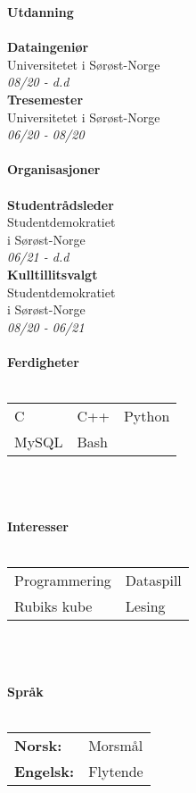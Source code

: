 \documentclass[a4paper, 12pt]{article}
\begin{document}
    \begin{minipage}[t]{0.3\textwidth}
        \Large\textbf{Utdanning}\\\\
        \normalsize\textbf{Dataingeniør}\\
        \small{Universitetet i Sørøst-Norge}\\
        \small \textit{08/20 - d.d} \\

        \normalsize\textbf{Tresemester}\\
        \small{Universitetet i Sørøst-Norge}\\
        \small \textit{06/20 - 08/20}\\\\
        \horizontalline{2.5cm}{0.4cm}
        \Large\textbf{Organisasjoner}\\\\
        \normalsize\textbf{Studentrådsleder}\\
        \small{Studentdemokratiet \\i Sørøst-Norge}\\
        \small{\textit{06/21 - d.d}}\\

        \normalsize\textbf{Kulltillitsvalgt}\\
        \small{Studentdemokratiet \\i Sørøst-Norge}\\
        \small{\textit{08/20 - 06/21}}\\\\
        \horizontalline{2.5cm}{0.4cm}
        \Large\textbf{Ferdigheter}\\\\
        \normalsize{
        \begin{tabular}{@{}l l l}
            C & C++ & Python \\
            MySQL & Bash & \\
        \end{tabular}\\\\
    }
        \horizontalline{2.5cm}{0.4cm}
        \Large\textbf{Interesser}\\\\
        \normalsize{
        \begin{tabular}{@{}l l}
            Programmering & Dataspill \\
            Rubiks kube & Lesing
        \end{tabular}\\\\
    }
        \horizontalline{2.5cm}{0.4cm}
        \Large\textbf{Språk}\\\\
        \normalsize{
        \begin{tabular}{@{}l l}
            \textbf{Norsk:} & Morsmål \\
            \textbf{Engelsk:} & Flytende \\
        \end{tabular}
    }
    \end{minipage}
\end{document}
